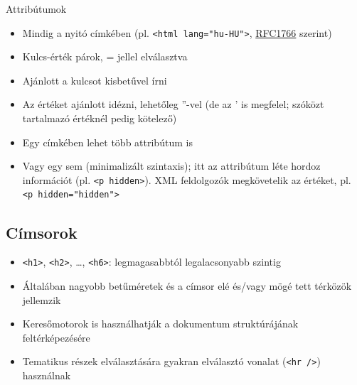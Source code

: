 \documentclass[usenames,dvipsnames,aspectratio=169]{beamer}
\newcommand{\kiemel}[1]{{\color{kiemelesszin}#1}}
\newcommand{\hiv}[1]{{\color{hivatkozasszin}#1}}
\begin{document}
\begin{frame}
  Attribútumok
  \begin{itemize}
    \item Mindig a nyitó címkében (pl. \texttt{<html lang="hu-HU">}, \hiv{\href{http://www.ietf.org/rfc/rfc1766.txt}{RFC1766}} szerint)
    \item Kulcs-érték párok, = jellel elválasztva
    \item \kiemel{Ajánlott} a kulcsot kisbetűvel írni
    \item Az értéket \kiemel{ajánlott} idézni, lehetőleg ''-vel (de az ' is megfelel; szóközt tartalmazó értéknél pedig kötelező)
    \item Egy címkében lehet több attribútum is
    \item Vagy egy sem (minimalizált szintaxis); itt az attribútum léte hordoz információt (pl. \texttt{<p hidden>}). XML feldolgozók megkövetelik az értéket, pl. \texttt{<p~hidden="hidden">}
  \end{itemize}
\end{frame}

\subsection{Címsorok}

\begin{frame}
  \begin{itemize}
    \item \texttt{<h1>}, \texttt{<h2>}, \dots, \texttt{<h6>}: legmagasabbtól legalacsonyabb szintig
    \item Általában nagyobb betűméretek és a címsor elé és/vagy mögé tett térközök jellemzik
    \item Keresőmotorok is használhatják a dokumentum struktúrájának feltérképezésére
    \item Tematikus részek elválasztására gyakran elválasztó vonalat (\texttt{<hr />}) használnak
  \end{itemize}
\end{frame}
\end{document}
